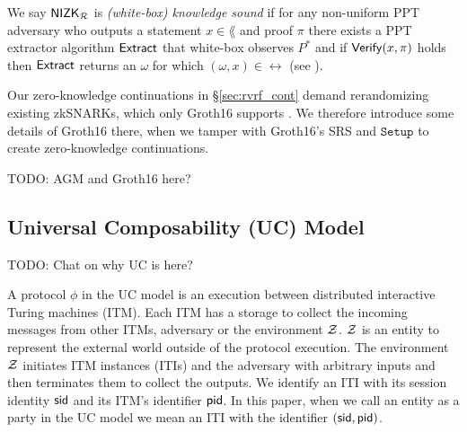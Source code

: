 \def\advP{\ensuremath{P^*}\xspace} %

\begin{definition}\label{def:nizk_knowledge_sound}
We say ${\mathsf{NIZK}}_\mathcal{R}$ is {\em (white-box) knowledge sound} if
for any non-uniform PPT adversary \adv who outputs a statement $x \in \lang$ and proof $\pi$
there exists a PPT extractor algorithm ${\mathsf{Extract}}$ that white-box observes $\advP$ and
if ${\mathsf{Verify}}(x,\pi)$ holds then ${\mathsf{Extract}}$ returns an $\omega$ for which $(\omega,x) \in \rel$
(see \cite[Def. 7, \S A, pap. 29]{RandomizationGroth16}).
\end{definition}

Our zero-knowledge continuations in \S\ref{sec:rvrf_cont} demand
rerandomizing existing zkSNARKs, which only Groth16 supports \cite{Groth16}.
We therefore introduce some details of Groth16 \cite{Groth16} there,
when we tamper with Groth16's SRS and $\mathtt{Setup}$ to create zero-knowledge continuations. 

%

TODO: AGM and Groth16 here?


\subsection{Universal Composability (UC) Model}

TODO: Chat on why UC is here?

A protocol $ \phi $ in the UC model is an execution between distributed interactive Turing machines (ITM). Each ITM has a storage to collect the incoming messages from other ITMs, adversary \adv or the environment $ \mathcal{Z} $. $ \mathcal{Z} $ is an entity to represent the external world outside of the protocol execution.  The environment $ \mathcal{Z} $ initiates ITM instances (ITIs) and the adversary \adv with arbitrary inputs and then terminates them to collect the outputs.
We identify an ITI with its session identity $ \textsf{sid} $ and its ITM's identifier $ \textsf{pid} $. In this paper, when we call an entity as a party in the UC model we mean an ITI with the identifier $ (\textsf{sid}, \textsf{pid}) $.

